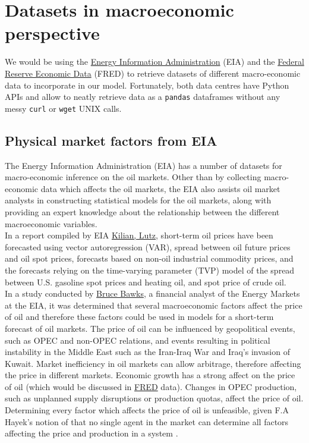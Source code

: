 \section{Datasets in macroeconomic perspective}

We would be using the \href{https://www.eia.gov/}{Energy Information Administration} (EIA) and the \href{https://fred.stlouisfed.org/}{Federal Reserve Economic Data} (FRED) to retrieve datasets of different macro-economic data to incorporate in our model. Fortunately, both data centres have Python APIs and allow to neatly retrieve data as a \texttt{pandas} dataframes without any messy \texttt{curl} or \texttt{wget} UNIX calls.

\subsection{Physical market factors from EIA}
\label{eia}

The Energy Information Administration (EIA) has a number of datasets for macro-economic inference on the oil markets. Other than by collecting macro-economic data which affects the oil markets, the EIA also assists oil market analysts in constructing statistical models for the oil markets, along with providing an expert knowledge about the relationship between the different macroeconomic variables. \\

In a report compiled by EIA \cite{eiaoilpriceforecasts} \href{http://www-personal.umich.edu/~lkilian/}{Kilian, Lutz}, short-term oil prices have been forecasted using vector autoregression (VAR), spread between oil future prices and oil spot prices, forecasts based on non-oil industrial commodity prices, and the forecasts relying on the time-varying parameter (TVP) model of the spread between U.S. gasoline spot prices and heating oil, and spot price of crude oil.\\

In a study \cite{whatdrivescrudeoilprices} conducted by \href{mailto:bruce.bawks@eia.gov}{Bruce Bawks}, a financial analyst of the Energy Markets at the EIA, it was determined that several macroeconomic factors affect the price of oil and therefore these factors could be used in models for a short-term forecast of oil markets.  The price of oil can be influenced by geopolitical events, such as OPEC and non-OPEC relations, and events resulting in political instability in the Middle East such as the Iran-Iraq War and Iraq's invasion of Kuwait. Market inefficiency \footnotemark in oil markets can allow arbitrage, therefore affecting the price in different markets.  Economic growth has a strong affect on the price of oil (which would be discussed in \hyperref[fred]{FRED} data). Changes in OPEC production, such as unplanned supply disruptions or production quotas, affect the price of oil. Determining every factor which affects the price of oil is unfeasible, given F.A Hayek's notion of that no single agent in the market can determine all factors affecting the price and production in a system \cite{book:642976}.  \\

